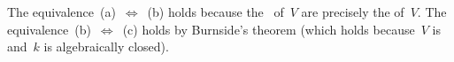 \section{}

The equivalence~(a)~$\iff$~(b) holds because the~ of~$V$ are precisely the  of~$V$.
The equivalence~(b)~$\iff$~(c) holds by Burnside’s theorem (which holds because~$V$ is~ and~$k$ is algebraically closed).




